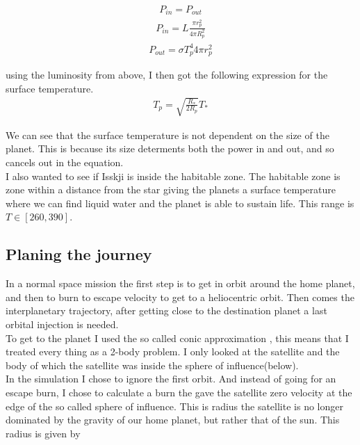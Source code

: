 \documentclass[a4paper, 10pt]{article}
\begin{document}
\begin{align}
P_{in} = P_{out}
\end{align}
\begin{align}
 P_{in} = L \frac{\pi r_p^2}{4\pi R_p^2}
\end{align}
\begin{align}
 P_{out} = \sigma T_p^4 4\pi r_p^2
\end{align}

using the luminosity from above, I then got the following expression for the surface temperature.
\begin{align}\label{eq:temp}
 T_p = \sqrt{\frac{R_*}{2R_p}}T_*
\end{align}

We can see that the surface temperature is not dependent on the size of the planet. This is because its size  determents both the power in and out, and so cancels out in the equation.\\

I also wanted to see if Isskji is inside the habitable zone. The habitable zone is zone within a distance from the star giving the planets a surface temperature where we can find liquid water and the planet is able to sustain life. This range is $T \in [260 , 390]$.

\subsection{Planing the journey}
In a normal space mission the first step is to get in orbit around the home planet, and then to burn to escape velocity to get to a heliocentric orbit. Then comes the interplanetary trajectory, after getting close to the destination planet a last orbital injection is needed.\\

To get to the planet I used the so called conic approximation \cite{SpaceDynamics}, this means that I treated every thing as a 2-body problem. I only looked at the satellite and the body of which the satellite was inside the sphere of influence(below). \\

In the simulation I chose to ignore the first orbit. And instead of going for an escape burn, I chose to calculate a burn the gave the satellite zero velocity at the edge of the so called sphere of influence. This is radius the satellite is no longer dominated by the gravity of our home planet, but rather that of the sun. This radius is given by\cite{sphere}
\end{document}
